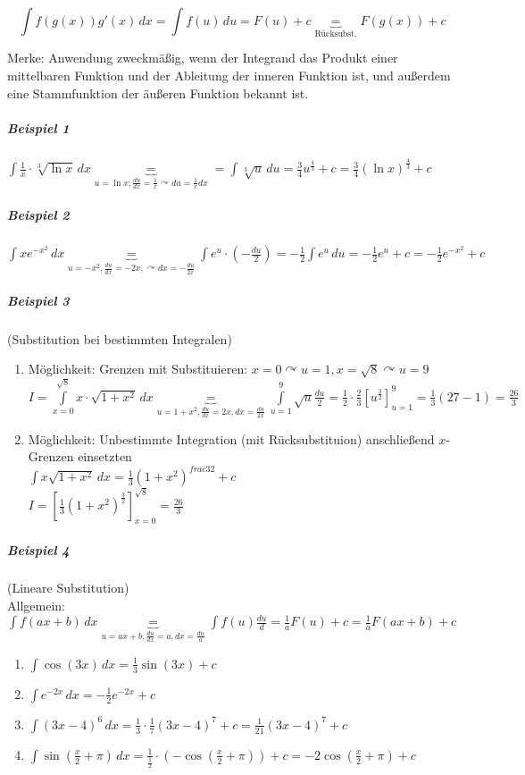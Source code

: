 \documentclass[a4paper]{scrartcl}
\begin{document}
\begin{equation}\label{421Sbst1}
\int f(g(x)) g'(x) \, dx = \int f(u) \, du = F(u) +c \underbrace{=}_{\text{Rücksubst.}} F(g(x)) + c
\end{equation}

Merke: Anwendung zweckmäßig, wenn der Integrand das Produkt einer mittelbaren Funktion und der Ableitung der inneren Funktion ist, und außerdem eine Stammfunktion der äußeren Funktion bekannt ist.

\subparagraph{Beispiel 1} $\int \frac{1}{x} \cdot \sqrt[3]{\ln{x}} \, dx \underbrace{=}_{u = \ln{x}; \frac{du}{dx} = \frac{1}{x} \curvearrowright du=\frac{1}{x} dx} = \int \sqrt[3]{u} \, du = \frac{3}{4} u^{\frac{4}{3}} + c = \frac{3}{4} ( \ln{x})^{\frac{4}{3}} +c$

\subparagraph{Beispiel 2} $\int x e^{-x^2} \, dx \underbrace{=}_{u = -x^2, \frac{du}{dx} = -2x, \curvearrowright dx =- \frac{du}{2x}} \int e^u \cdot (-\frac{du}{2}) = -\frac{1}{2} \int e^u \, du = -\frac{1}{2} e^u +c = -\frac{1}{2} e^{-x^2} +c$

\subparagraph{Beispiel 3} (Substitution bei bestimmten Integralen)
\begin{enumerate}
\item Möglichkeit: Grenzen mit Substituieren: $x=0 \curvearrowright u = 1, x= \sqrt{8} \curvearrowright u = 9$\\
 $I = \int\limits_{x=0}^{\sqrt{8}} x \cdot \sqrt{1 +x^2} \, dx \underbrace{=}_{u=1+x^2, \frac{du}{dx} = 2x, dx= \frac{du}{2x}} \int\limits_{u=1}^{9} \sqrt{u} \frac{du}{2} = \frac{1}{2} \cdot \frac{2}{3} [ u ^{\frac{3}{2}}]^9_{u=1} = \frac{1}{3} (27-1) = \frac{26}{3}$
\item Möglichkeit: Unbestimmte Integration (mit Rücksubstituion) anschließend $x$-Grenzen einsetzten\\
$\int x \sqrt{1+x^2} \, dx = \frac{1}{3} (1+x^2)^{frac{3}{2}} + c$\\
$I = [ \frac{1}{3} (1+x^2)^{\frac{3}{2}} ]_{x=0}^{\sqrt{8}} = \frac{26}{3}$
\end{enumerate}

\subparagraph{Beispiel 4}(Lineare Substitution)\\
Allgemein: $\int f(ax+b) \, dx \underbrace{=}_{u = ax+b, \frac{du}{dx} = a, dx= \frac{du}{a}} \int f(u) \frac{du}{d} = \frac{1}{a} F(u) +c = \frac{1}{a} F(ax+b) +c$

\begin{enumerate}
\item $\int \cos{(3x)} \, dx = \frac{1}{3} \sin{(3x)} + c$
\item $\int e^{-2x} \, dx = - \frac{1}{2} e^{-2x} +c$
\item $\int (3x -4)^6 \, dx  = \frac{1}{3} \cdot \frac{1}{7} (3x-4)^7 +c = \frac{1}{21} (3x-4)^7 +c$
\item $\int \sin{(\frac{x}{2} + \pi )} \, dx = \frac{1}{\frac{1}{2}} \cdot (-\cos{(\frac{x}{2} + \pi)})+c = -2\cos{(\frac{x}{2} + \pi)} +c$
\end{enumerate}
\end{document}
